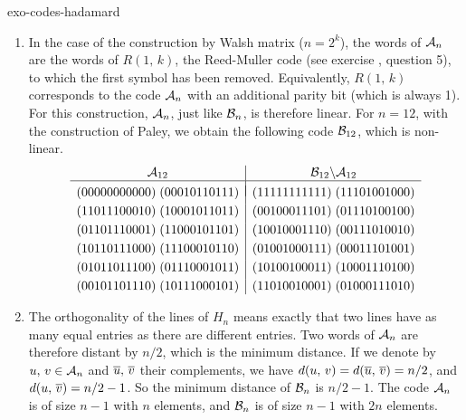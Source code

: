  
\begin{correction}{exo-codes-hadamard}
\begin{enumerate}
\item {}   In the case of the construction by Walsh matrix ($ n = 2^k $), the words of $ \mathcal{A}_n $ are the words of $ R (1, \, k) $, the Reed-Muller code (see exercise , question 5), to which the first symbol has been removed. Equivalently, $ R (1, \, k) $ corresponds to the code $ \mathcal{A}_n $ with an additional parity bit (which is always 1). For this construction, $ \mathcal{A}_n $, just like $ \mathcal{B}_n $, is therefore linear. For $ n = 12 $, with the construction of Paley, we obtain the following code $ \mathcal{B}_{12} $, which is non-linear.
\begin{equation*}
\begin{array}{c | c} \mathcal{A}_{12} & \mathcal{B}_{12} \backslash \mathcal{A}_{12} \\\hline \\[- 3mm] (00000000000) \; (00010110111) & (11111111111) \; (11101001000) \\[1mm] (11011100010) \; (10001011011) & (00100011101) \; (01110100100) \\[1mm] (01101110001) \; (11000101101) & (10010001110) \; (00111010010) \\[1mm] (10110111000) \; (11100010110) & (01001000111) \; (00011101001) \\[1mm] (01011011100) \; (01110001011) & (10100100011) \; (10001110100) \\[1mm] (00101101110) \; (10111000101) & (11010010001) \; (01000111010) \end{array}
\end{equation*}
 
\item The orthogonality of the lines of $ H_n $ means exactly that two lines have as many equal entries as there are different entries. Two words of $ \mathcal{A}_n $ are therefore distant by $ n/2 $, which is the minimum distance. If we denote by $ u, \, v \in \mathcal{A}_n $ and $ \overline{u}, \, \overline{v} $ their complements, we have $ d (u, \, v) = d (\overline{u}, \, \overline{v}) = n/2 $, and $ d (u, \, \overline{v}) = n/2-1 $. So the minimum distance of $ \mathcal{B}_n $ is $ n/2-1 $. The code $ \mathcal{A}_n $ is of size $ n-1 $ with $ n $ elements, and $ \mathcal{B}_n $ is of size $ n-1 $ with $ 2n $ elements.
\end{enumerate}
\end{correction}
 
